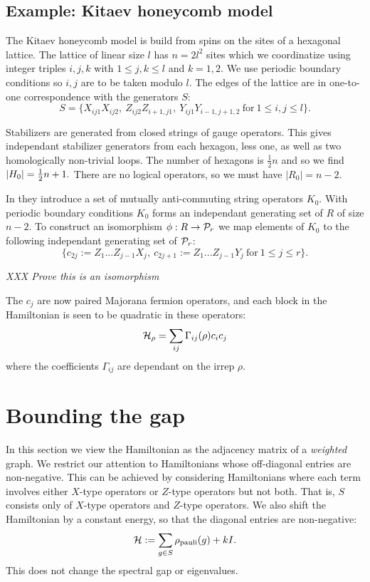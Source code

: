 \documentclass[12pt,notitlepage,longbibliography,nofootinbib,tightenlines]{revtex4}
\begin{document}
\subsection{Example: Kitaev honeycomb model}

The Kitaev honeycomb model is build from spins on
the sites of a hexagonal lattice. 
The lattice of linear size $l$ has $n=2l^2$ sites
which we coordinatize using integer triples $i, j, k$
with $1\le j, k\le l$ and $k=1, 2.$
We use periodic boundary conditions so $i, j$ are
to be taken modulo $l$.
The edges of the lattice are in one-to-one
correspondence with the generators $S$:
$$
S = \big\{X_{ij1}X_{ij2},\ Z_{ij2}Z_{i+1,j1},\ Y_{ij1}Y_{i-1,j+1,2}
\ \mbox{for}\ 1\le i,j\le l\big\}.
$$

Stabilizers are generated from closed strings of
gauge operators. This gives independant stabilizer generators
from each hexagon, less one, as well as two
homologically non-trivial loops.
The number of hexagons is $\frac{1}{2}n$ and
so we find $|H_0|=\frac{1}{2} n+1.$
There are no logical operators, so we
must have $|R_0|=n-2.$

In \cite{Kells2009} they introduce a set of
mutually anti-commuting string operators $K_0.$
With periodic boundary conditions $K_0$ forms an
independant generating set of $R$ of size $n-2.$
To construct an isomorphism $\phi: R\to \mathcal{P}_r$
we map elements of $K_0$ to the following independant generating
set of $\mathcal{P}_r$:
$$
\big\{c_{2j}:=Z_1...Z_{j-1} X_j,\ c_{2j+1}:=Z_1...Z_{j-1} Y_j\ \mbox{for}\ 1\le j\le r\big\}.
$$

{\it XXX Prove this is an isomorphism }

The $c_j$ are now paired Majorana fermion operators, 
and each block in the Hamiltonian
is seen to be quadratic in these operators:
$$
    \mathcal{H}_\rho = \sum_{ij} \Gamma_{ij}(\rho) c_i c_j
$$
where the coefficients $\Gamma_{ij}$
are dependant on the irrep $\rho.$


\section{Bounding the gap}

In this section we view the Hamiltonian as the adjacency matrix of
a {\it weighted} graph.
We restrict our attention to Hamiltonians whose off-diagonal entries
are non-negative.
This can be achieved by considering Hamiltonians where each term
involves either $X$-type operators or $Z$-type operators but not both.
That is, $S$ consists only of $X$-type operators and $Z$-type operators.
We also shift the Hamiltonian by a constant energy, so that
the diagonal entries are non-negative:
$$
\mathcal{H} := \sum_{g\in S} \rho_{\mathrm{pauli}}(g) + kI.
$$
This does not change
the spectral gap or eigenvalues.
\end{document}
